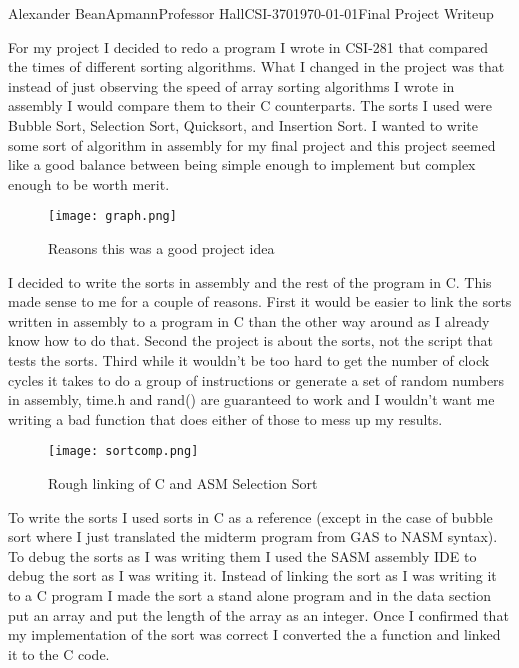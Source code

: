 \documentclass[11pt,letterpaper]{article}
\begin{document}
\lstset{language=[x86masm]Assembler}
\begin{mla}{Alexander Bean}{Apmann}{Professor Hall}{CSI-370}{\today}{Final Project Writeup}

For my project I decided to redo a program I wrote in CSI-281 that compared the times of different sorting algorithms. What I changed in the project was that instead of just observing the speed of array sorting algorithms I wrote in assembly I would compare them to their C counterparts. The sorts I used were Bubble Sort, Selection Sort, Quicksort, and Insertion Sort. I wanted to write some sort of algorithm in assembly for my final project and this project seemed like a good balance between being simple enough to implement but complex enough to be worth merit.

\begin{figure}[h!]
	\caption{Reasons this was a good project idea}
	\centering
		\texttt{[image: graph.png]}
\end{figure}

I decided to write the sorts in assembly and the rest of the program in C. This made sense to me for a couple of reasons. First it would be easier to link the sorts written in assembly to a program in C than the other way around as I already know how to do that. Second the project is about the sorts, not the script that tests the sorts. Third while it wouldn't be too hard to get the number of clock cycles it takes to do a group of instructions or generate a set of random numbers in assembly, time.h and rand() are guaranteed to work and I wouldn't want me writing a bad function that does either of those to mess up my results.

\begin{figure}[h!]
	\caption{Rough linking of C and ASM Selection Sort}
	\centering
		\texttt{[image: sortcomp.png]}
\end{figure}

To write the sorts I used sorts in C as a reference (except in the case of bubble sort where I just translated the midterm program from GAS to NASM syntax). To debug the sorts as I was writing them I used the SASM assembly IDE to debug the sort as I was writing it. Instead of linking the sort as I was writing it to a C program I made the sort a stand alone program and in the data section put an array and put the length of the array as an integer. Once I confirmed that my implementation of the sort was correct I converted the a function and linked it to the C code.


\end{mla}
\end{document}
